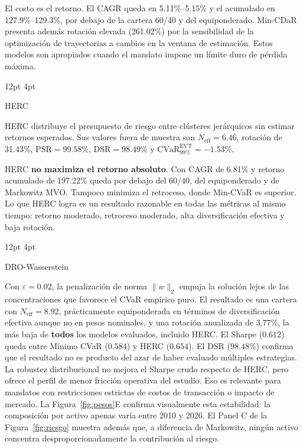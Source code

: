 \documentclass[11pt,a4paper]{article}
\makeatletter
\renewcommand\subsection{\@startsection{subsection}{2}{\z@}%
  {12pt \@plus 2pt \@minus 1pt}%
  {4pt}%
  {\raggedright\normalsize\bfseries\color{navyblue}}}
\makeatother
\begin{document}
El costo es el retorno. El CAGR queda en 5.11\%--5.15\% y el acumulado en 127.9\%--129.3\%, por debajo de la cartera 60/40 y del equiponderado. Min-CDaR presenta además rotación elevada (261.02\%) por la sensibilidad de la optimización de trayectorias a cambios en la ventana de estimación. Estos modelos son apropiados cuando el mandato impone un límite duro de pérdida máxima.

\subsection{HERC}

HERC distribuye el presupuesto de riesgo entre clústeres jerárquicos sin estimar retornos esperados. Sus valores fuera de muestra son $N_{\text{eff}} = 6.46$, rotación de 31.43\%, $\text{PSR} = 99.58\%$, $\text{DSR} = 98.49\%$ y $\text{CVaR}_{99\%}^{\text{EVT}} = -1.53\%$.

HERC \textbf{no maximiza el retorno absoluto}. Con CAGR de 6.81\% y retorno acumulado de 197.22\% queda por debajo del 60/40, del equiponderado y de Markowitz MVO. Tampoco minimiza el retroceso, donde Min-CVaR es superior. Lo que HERC logra es un resultado razonable en todas las métricas al mismo tiempo: retorno moderado, retroceso moderado, alta diversificación efectiva y baja rotación.

\subsection{DRO-Wasserstein}

Con $\varepsilon = 0.02$, la penalización de norma $\|w\|_2$ empuja la solución lejos de las concentraciones que favorece el CVaR empírico puro. El resultado es una cartera con $N_{\text{eff}} = 8.92$, prácticamente equiponderada en términos de diversificación efectiva aunque no en pesos nominales, y una rotación anualizada de $3.77\%$, la más baja de \textbf{todos} los modelos evaluados, incluido HERC. El Sharpe ($0.612$) queda entre Mínimo CVaR ($0.584$) y HERC ($0.654$). El DSR ($98.48\%$) confirma que el resultado no es producto del azar de haber evaluado múltiples estrategias. La robustez distribucional no mejora el Sharpe crudo respecto de HERC, pero ofrece el perfil de menor fricción operativa del estudio. Eso es relevante para mandatos con restricciones estrictas de costos de transacción o impacto de mercado. La Figura~\ref{fig:pesos}E confirma visualmente esta estabilidad: la composición por activo apenas varía entre 2010 y 2026. El Panel C de la Figura~\ref{fig:riesgo} muestra además que, a diferencia de Markowitz, ningún activo concentra desproporcionadamente la contribución al riesgo.
\end{document}
